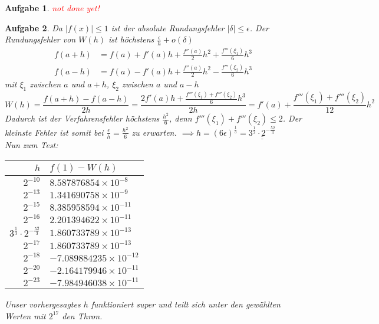 \documentclass[11pt]{article}
\theoremstyle{break}
\newtheorem{task}{Aufgabe}
\newcommand{\abs}[1]{\ensuremath{\left\vert #1 \right\vert}}
\newcommand{\result}[1]{\ensuremath{\underline{\underline{#1}}}}
\newcommand{\ndy}{
    \textcolor{red} {\hfill not done yet!}
    \reversemarginpar
    \marginpar{\raggedleft\textcolor{red}{\rule{2mm}{2mm}}}
}
\begin{document}
\begin{task}
    \ndy
\end{task}

\begin{task}
    Da $\abs{f(x)}\leq 1$ ist der absolute Rundungsfehler $\abs{\delta} \leq \epsilon$.
    Der Rundungsfehler von $W(h)$ ist höchstens $\frac{\epsilon}{h}+o(\delta)$
    \begin{align*}
        f(a + h) &= f(a) + f'(a) h + \frac{f''(a)}{2} h^2 + \frac{f'''(\xi_1)}{6}h^3\\
        f(a - h) &= f(a) - f'(a) h + \frac{f''(a)}{2} h^2 - \frac{f'''(\xi_2)}{6}h^3
    \end{align*}
    mit $\xi_1$ zwischen $a$ und $a+h$, $\xi_2$ zwischen $a$ und $a-h$
        $$W(h) = \frac{f(a+h) - f(a-h)}{2h} = \frac{2f'(a) h + \frac{f'''(\xi_1) + f'''(\xi_2)}{6}h^3}{2h} = f'(a) + \frac{f'''(\xi_1) + f'''(\xi_2)}{12}h^2$$
    Dadurch ist der Verfahrensfehler höchstens $\frac{h^2}{6}$, denn $f'''(\xi_1) + f'''(\xi_2)\leq 2$.
    Der kleinste Fehler ist somit bei $\frac{\epsilon}{h}=\frac{h^2}{6}$ zu erwarten. 
    $\implies h=(6\epsilon)^\frac{1}{3} = \result{3^\frac{1}{3}\cdot 2^{-\frac{52}{3}}}$\vspace{3mm}\\
    Nun zum Test: \\
    \begin{center}
        \begin{tabular}{r|l}
            $h$ & $f(1) - W(h)$\\\hline
            $2^{-10}$ & $8.587876854\times 10^{-8}$\\
            $2^{-13}$ & $1.341690758\times 10^{-9}$\\
            $2^{-15}$ & $8.385958594\times 10^{-11}$\\
            $2^{-16}$ & $2.201394622\times 10^{-11}$\\
            $3^\frac{1}{3}\cdot 2^{-\frac{52}{3}}$ & $1.860733789\times 10^{-13}$\\
            $2^{-17}$ & $1.860733789\times 10^{-13}$\\
            $2^{-18}$ & $-7.089884235\times 10^{-12}$\\
            $2^{-20}$ & $-2.164179946\times 10^{-11}$\\
            $2^{-23}$ & $-7.984946038\times 10^{-11}$
        \end{tabular}
    \end{center}
    Unser vorhergesagtes $h$ funktioniert super und teilt sich unter den gewählten Werten mit $2^{17}$ den Thron.
\end{task}
\end{document}
